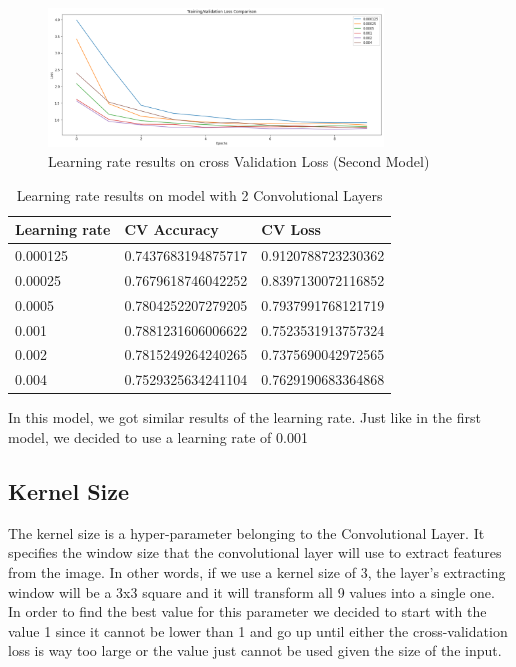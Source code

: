 \documentclass[conference]{IEEEtran}
\begin{document}
\begin{figure}[H]
    \centering
    \includegraphics[width=3.5in]{pictures/learning_rate_loss.png}
    \caption{Learning rate results on cross Validation Loss (Second Model)}\label{fig:example4}
\end{figure}

\begin{table}[H]
\centering
\caption{Learning rate results on model with 2 Convolutional Layers}
\begin{tabular}{ | m{3.5em} | m{3.2cm}| m{3.2cm} | } 
\hline
Learning rate & CV Accuracy & CV Loss \\ 
\hline
0.000125 & 0.7437683194875717 & 0.9120788723230362 \\
\hline
0.00025 & 0.7679618746042252 & 0.8397130072116852 \\
\hline
0.0005 & 0.7804252207279205 & 0.7937991768121719 \\
\hline
0.001 & 0.7881231606006622 & 0.7523531913757324 \\
\hline
0.002 & 0.7815249264240265 & 0.7375690042972565 \\
\hline
0.004 & 0.7529325634241104 & 0.7629190683364868 \\
\hline
\end{tabular}
\end{table}

In this model, we got similar results of the learning rate. Just like in the first model, we decided to use a learning rate of 0.001

\subsection{Kernel Size}
The kernel size is a hyper-parameter belonging to the Convolutional Layer. It specifies the window size that the convolutional layer will use to extract features from the image. In other words, if we use a kernel size of 3, the layer's extracting window will be a 3x3 square and it will transform all 9 values into a single one. In order to find the best value for this parameter we decided to start with the value 1 since it cannot be lower than 1 and go up until either the cross-validation loss is way too large or the value just cannot be used given the size of the input.
\end{document}
